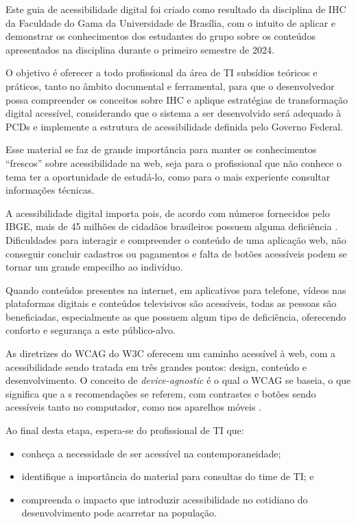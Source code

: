 \documentclass[
  12pt,
  openright,
  twoside,
  a4paper,
  english,
  french,
  spanish,
  brazil
]{abntex2}
\begin{document}
Este guia de acessibilidade digital foi criado como resultado da disciplina de
IHC da Faculdade do Gama da Universidade de Brasília, com o intuito de aplicar e
demonstrar os conhecimentos dos estudantes do grupo sobre os conteúdos
apresentados na disciplina durante o primeiro semestre de 2024.

O objetivo é oferecer a todo profissional da área de TI subsídios teóricos e
práticos, tanto no âmbito documental e ferramental, para que o desenvolvedor
possa compreender os conceitos sobre IHC e aplique estratégias de transformação
digital acessível, considerando que o sistema a ser desenvolvido será adequado à
PCDs e implemente a estrutura de acessibilidade definida pelo Governo Federal.

Esse material se faz de grande importância para manter os conhecimentos
``frescos'' sobre acessibilidade na web, seja para o profissional que não
conhece o tema ter a oportunidade de estudá-lo, como para o mais experiente
consultar informações técnicas.

A acessibilidade digital importa pois, de acordo com números fornecidos pelo
IBGE, mais de 45 milhões de cidadãos brasileiros possuem alguma deficiência
\cite{DAP:Guia-de-Boas-Praticas}. Dificuldades para interagir e compreender o
conteúdo de uma aplicação web, não conseguir concluir cadastros ou pagamentos e
falta de botões acessíveis podem se tornar um grande empecilho ao indivíduo.

Quando conteúdos presentes na internet, em aplicativos para telefone, vídeos nas
plataformas digitais e conteúdos televisivos são acessíveis, todas as pessoas
são beneficiadas, especialmente as que possuem algum tipo de deficiência,
oferecendo conforto e segurança a este público-alvo.

As diretrizes do WCAG do W3C oferecem um caminho acessível à web, com a
acessibilidade sendo tratada em três grandes pontos: design, conteúdo e
desenvolvimento. O conceito de \textit{device-agnostic} é o qual o WCAG se
baseia, o que significa que a s recomendações se referem, com contrastes e
botões sendo acessíveis tanto no computador, como nos aparelhos móveis
\cite{DAP:Guia-de-Boas-Praticas}.

Ao final desta etapa, espera-se do profissional de TI que:

\begin{itemize}
  \item conheça a necessidade de ser acessível na contemporaneidade;
  \item identifique a importância do material para consultas do time de TI; e
  \item
    compreenda o impacto que introduzir acessibilidade no cotidiano do
    desenvolvimento pode acarretar na população.
\end{itemize}
\end{document}
